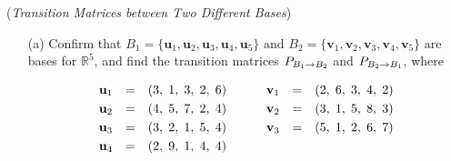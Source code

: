 \begin{exer} (\textit{Transition Matrices between Two Different Bases})\\

\begin{enumerate}

\item[(a)] Confirm that $B_{1} = \{\mathbf{u}_{1}, \mathbf{u}_{2}, \mathbf{u}_{3}, \mathbf{u}_{4}, \mathbf{u}_{5}\}$ and $B_{2} = \{\mathbf{v}_{1}, \mathbf{v}_{2}, \mathbf{v}_{3}, \mathbf{v}_{4}, \mathbf{v}_{5}\}$ are bases for $\mathbb{R}^{5}$, and find the transition matrices $P_{\tiny{B_{1} \rightarrow B_{2}}}$ and $P_{\tiny{B_{2} \rightarrow B_{1}}}$, where

\begin{displaymath}
\begin{array}{lllllll}
\vspace{1mm} \mathbf{u}_{1} & = & (3, \hspace{1mm} 1, \hspace{1mm} 3, \hspace{1mm} 2, \hspace{1mm} 6) & \hspace{4mm} & \mathbf{v}_{1} & = & (2, \hspace{1mm} 6, \hspace{1mm} 3, \hspace{1mm} 4, \hspace{1mm} 2) \\ \vspace{1mm} \mathbf{u}_{2} & = & (4, \hspace{1mm} 5, \hspace{1mm} 7, \hspace{1mm} 2, \hspace{1mm} 4) & \hspace{4mm} & \mathbf{v}_{2} & = & (3, \hspace{1mm} 1, \hspace{1mm} 5, \hspace{1mm} 8, \hspace{1mm} 3) \\ \vspace{1mm} \mathbf{u}_{3} & = & (3, \hspace{1mm} 2, \hspace{1mm} 1, \hspace{1mm} 5, \hspace{1mm} 4) & \hspace{4mm} & \mathbf{v}_{3} & = & (5, \hspace{1mm} 1, \hspace{1mm} 2, \hspace{1mm} 6, \hspace{1mm} 7) \\ \vspace{1mm} \mathbf{u}_{4} & = & (2, \hspace{1mm} 9, \hspace{1mm} 1, \hspace{1mm} 4, \hspace{1mm} 4) & \hspace{4mm} & 
\end{array}
\end{displaymath}
\end{enumerate}
\end{exer}

